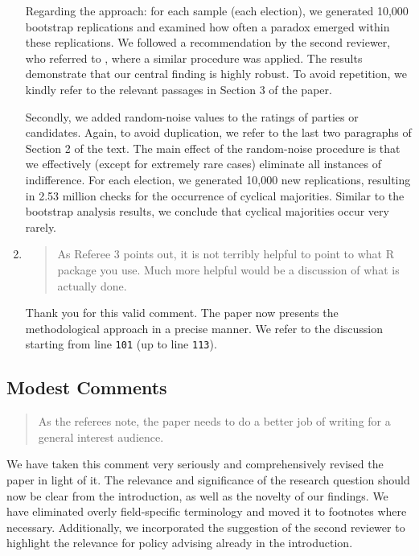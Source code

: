 \documentclass[a4paper, 12pt]{scrartcl}
\begin{document}
\begin{enumerate}[label=(\alph*)]
Regarding the approach: for each sample (each election), we generated 10,000 bootstrap replications and examined how often a paradox emerged within these replications. We followed a recommendation by the second reviewer, who referred to \cite{Darmann2019}, where a similar procedure was applied. The results demonstrate that our central finding is highly robust. To avoid repetition, we kindly refer to the relevant passages in Section 3 of the paper.

Secondly, we added random-noise values to the ratings of parties or candidates. Again, to avoid duplication, we refer to the last two paragraphs of Section 2 of the text. The main effect of the random-noise procedure is that we effectively (except for extremely rare cases) eliminate all instances of indifference. For each election, we generated 10,000 new replications, resulting in 2.53 million checks for the occurrence of cyclical majorities. Similar to the bootstrap analysis results, we conclude that cyclical majorities occur very rarely.

\item \begin{quote}
As Referee 3 points out, it is not terribly helpful to point to what R package you use. Much more helpful would be a discussion of what is actually done.
\end{quote}
Thank you for this valid comment. The paper now presents the methodological approach in a precise manner. We refer to the discussion starting from line \texttt{101} (up to line \texttt{113}).
\end{enumerate}

\subsection*{Modest Comments}
\begin{quotation}
 As the referees note, the paper needs to do a better job of writing for a general interest audience.
\end{quotation}

We have taken this comment very seriously and comprehensively revised the paper in light of it. The relevance and significance of the research question should now be clear from the introduction, as well as the novelty of our findings. We have eliminated overly field-specific terminology and moved it to footnotes where necessary. Additionally, we incorporated the suggestion of the second reviewer to highlight the relevance for policy advising already in the introduction.
\end{document}
